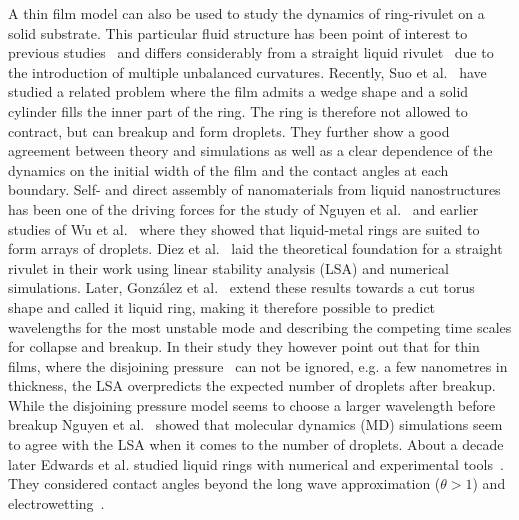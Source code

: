 \documentclass[twoside,twocolumn,9pt]{article}
\begin{document}
A thin film model can also be used to study the dynamics of ring-rivulet on a solid substrate.
This particular fluid structure has been point of interest to previous studies~\cite{nguyenCompetitionCollapseBreakup2012, gonzalezStabilityLiquidRing2013, wuCompetingLiquidPhase2011, edwardsControllingBreakupToroidal2021} and differs considerably from a straight liquid rivulet~\cite{diezBreakupFluidRivulets2009, diezStabilityFinitelengthRivulet2009, diezInstabilityTransverseLiquid2012} due to the introduction of multiple unbalanced curvatures.
Recently, Suo et al.~\cite{suoDewettingCornerFilm2023} have studied a related problem where the film admits a wedge shape and a solid cylinder fills the inner part of the ring. 
The ring is therefore not allowed to contract, but can breakup and form droplets.
They further show a good agreement between theory and simulations as well as a clear dependence of the dynamics on the initial width of the film and the contact angles at each boundary.
Self- and direct assembly of nanomaterials from liquid nanostructures has been one of the driving forces for the study of Nguyen et al.~\cite{nguyenCompetitionCollapseBreakup2012} and earlier studies of Wu et al.~\cite{wuBreakupPatternedNanoscale2010} where they showed that liquid-metal rings are suited to form arrays of droplets.
Diez et al.~\cite{diezBreakupFluidRivulets2009, diezStabilityFinitelengthRivulet2009} laid the theoretical foundation for a straight rivulet in their work using linear stability analysis (LSA) and numerical simulations. 
Later, Gonz{\'a}lez et al.~\cite{gonzalezStabilityLiquidRing2013} extend these results towards a cut torus shape and called it liquid ring, making it therefore possible to predict wavelengths for the most unstable mode and describing the competing time scales for collapse and breakup.
In their study they however point out that for thin films, where the disjoining pressure~\cite{schwartzSimulationDropletMotion1998, beckerComplexDewettingScenarios2003, oronLongscaleEvolutionThin1997} can not be ignored, e.g. a few nanometres in thickness, the LSA overpredicts  the expected number of droplets after breakup.
While the disjoining pressure model seems to choose a larger wavelength before breakup Nguyen et al.~\cite{nguyenCompetitionCollapseBreakup2012} showed that molecular dynamics (MD) simulations seem to agree with the LSA when it comes to the number of droplets.
About a decade later Edwards et al. studied liquid rings with numerical and experimental tools~\cite{edwardsControllingBreakupToroidal2021}.
They considered contact angles beyond the long wave approximation ($\theta > 1$) and electrowetting~\cite{mugeleElectrowettingConvenientWay2005}. 
\end{document}
